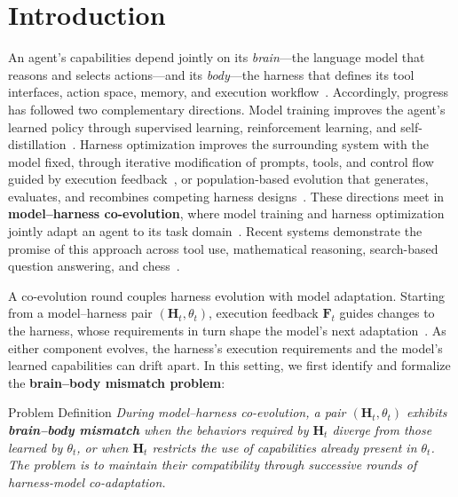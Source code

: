 \documentclass[11pt,a4paper]{article}
\begin{document}
\section{Introduction}
\label{sec:intro}
An agent's capabilities depend jointly on its \emph{brain}---the language model that reasons and selects actions---and its \emph{body}---the harness that defines its tool interfaces, action space, memory, and execution workflow~\citep{lou2026autoharness,chen2026harnessx}. Accordingly, progress has followed two complementary directions. Model training improves the agent's learned policy through supervised learning, reinforcement learning, and self-distillation~\citep{xia2026skillrl,yang2026coevolve,zhang2026lopd}. Harness optimization improves the surrounding system with the model fixed, through iterative modification of prompts, tools, and control flow guided by execution feedback~\citep{lou2026autoharness,lin2026ahe}, or population-based evolution that generates, evaluates, and recombines competing harness designs~\citep{lee2026metaharness,zhang2026darwinx}. These directions meet in \textbf{model--harness co-evolution}, where model training and harness optimization jointly adapt an agent to its task domain~\citep{chen2026harnessx,luo2026hase}. Recent systems demonstrate the promise of this approach across tool use, mathematical reasoning, search-based question answering, and chess~\citep{chen2026harnessforge,chen2026coharness,kim2026whale}.

A co-evolution round couples harness evolution with model adaptation. Starting from a model--harness pair $(\mathbf{H}_t,\theta_t)$, execution feedback $\mathbf{F}_t$ guides changes to the harness, whose requirements in turn shape the model's next adaptation~\citep{chen2026coharness}. As either component evolves, the harness's execution requirements and the model's learned capabilities can drift apart. In this setting, we first identify and formalize the \textbf{brain--body mismatch problem}:

\begin{insightbox}{Problem Definition}
\emph{During model--harness co-evolution, a pair $(\mathbf{H}_t,\theta_t)$ exhibits \textbf{brain--body mismatch} when the behaviors required by $\mathbf{H}_t$ diverge from those learned by $\theta_t$, or when $\mathbf{H}_t$ restricts the use of capabilities already present in $\theta_t$. The problem is to maintain their compatibility through successive rounds of harness-model co-adaptation.}
\end{insightbox}
\end{document}
